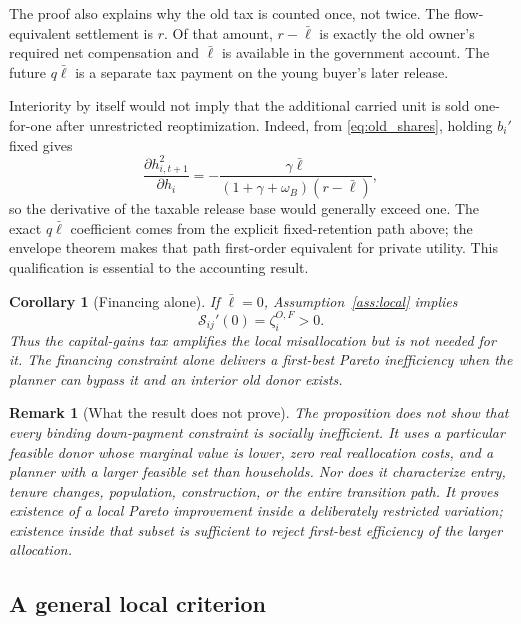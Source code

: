\documentclass[11pt]{article}
\newtheorem{corollary}{Corollary}
\newtheorem{remark}{Remark}
\newcommand{\1}{\mathbf 1}
\newcommand{\ellbar}{\bar\ell}
\begin{document}
The proof also explains why the old tax is counted once, not twice. The
flow-equivalent settlement is $r$. Of that amount, $r-\ellbar$ is exactly the
old owner's required net compensation and $\ellbar$ is available in the
government account. The future $q\ellbar$ is a separate tax payment on the
young buyer's later release.

Interiority by itself would not imply that the additional carried unit is sold
one-for-one after unrestricted reoptimization. Indeed, from
\eqref{eq:old_shares}, holding $b_i'$ fixed gives
\begin{equation}
\frac{\partial h_{i,t+1}^2}{\partial h_i}
=-\frac{\gamma\ellbar}
{(1+\gamma+\omega_B)(r-\ellbar)},
\end{equation}
so the derivative of the taxable release base would generally exceed one.
The exact $q\ellbar$ coefficient comes from the explicit fixed-retention path
above; the envelope theorem makes that path first-order equivalent for private
utility. This qualification is essential to the accounting result.

\begin{corollary}[Financing alone]
\label{cor:no_tax}
If $\ellbar=0$, Assumption~\ref{ass:local} implies
\begin{equation}
\mathcal S_{ij}'(0)=\zeta_i^{O,F}>0.
\end{equation}
Thus the capital-gains tax amplifies the local misallocation but is not needed
for it. The financing constraint alone delivers a first-best Pareto
inefficiency when the planner can bypass it and an interior old donor exists.
\end{corollary}

\begin{remark}[What the result does not prove]
The proposition does not show that every binding down-payment constraint is
socially inefficient. It uses a particular feasible donor whose marginal
value is lower, zero real reallocation costs, and a planner with a larger
feasible set than households. Nor does it characterize entry, tenure changes,
population, construction, or the entire transition path. It proves existence
of a local Pareto improvement inside a deliberately restricted variation;
existence inside that subset is sufficient to reject first-best efficiency of
the larger allocation.
\end{remark}

\subsection{A general local criterion}
\end{document}
